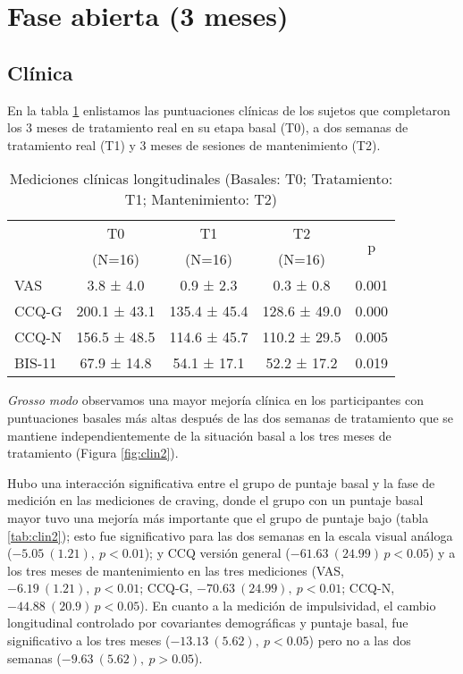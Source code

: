 \section{Fase abierta (3 meses)}
\subsection{Clínica}
En la tabla \ref{tab:cl2} enlistamos las puntuaciones clínicas de los sujetos que completaron los 3 meses de tratamiento real en su etapa basal (T0), a dos semanas de tratamiento real (T1) y 3 meses de sesiones de mantenimiento (T2).

\begin{table}[!htb]
    \centering
    \small
    \caption{Mediciones clínicas longitudinales (Basales: T0; Tratamiento: T1; Mantenimiento: T2)}
    \label{tab:cl2}
\begin{tabular}{lcccc}
\hline
 & T0 & T1 & T2 & \multirow{2}{*}{p}\\
 & (N=16) & (N=16) & (N=16) &  \\
\hline
VAS   &  3.8 ±  4.0 &  0.9 ±  2.3 &  0.3 ±  0.8 & 0.001\\
CCQ-G  & 200.1 ± 43.1 & 135.4 ± 45.4 & 128.6 ± 49.0 & 0.000\\
CCQ-N  & 156.5 ± 48.5 & 114.6 ± 45.7 & 110.2 ± 29.5 & 0.005\\
BIS-11 & 67.9 ± 14.8 & 54.1 ± 17.1 & 52.2 ± 17.2 & 0.019\\
\hline
\end{tabular}
\end{table}

\textit{Grosso modo} observamos una mayor mejoría clínica en los participantes con puntuaciones basales más altas después de las dos semanas de tratamiento que se mantiene independientemente de la situación basal a los tres meses de tratamiento (Figura \ref{fig:clin2}).\par
Hubo una interacción significativa entre el grupo de puntaje basal y la fase de medición en las mediciones de craving, donde el grupo con un puntaje basal mayor tuvo una mejoría más importante que el grupo de puntaje bajo (tabla \ref{tab:clin2}); esto fue significativo para las dos semanas en la escala visual análoga ($-5.05\ (1.21),\ p<0.01$); y CCQ versión general ($-61.63\ (24.99)\, p<0.05$) y a los tres meses de mantenimiento en las tres mediciones (VAS, $-6.19\ (1.21),\ p<0.01$; CCQ-G, $-70.63\ (24.99),\ p<0.01$; CCQ-N, $-44.88\ (20.9)\, p<0.05$). En cuanto a la medición de impulsividad, el cambio longitudinal controlado por covariantes demográficas y puntaje basal, fue significativo a los tres meses ($-13.13\ (5.62),\ p<0.05$) pero no a las dos semanas ($-9.63\ (5.62),\ p>0.05$).

